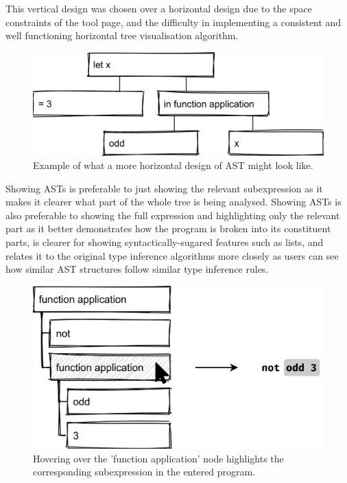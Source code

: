 \documentclass[a4paper,fleqn,oneside,12pt]{report}
\begin{document}
This vertical design was chosen over a horizontal design due to the space constraints of the tool page, and the difficulty in implementing a consistent and well functioning horizontal tree visualisation algorithm.

{\centering \begin{figure}[h!]
  \centering
  \includegraphics[width=0.813\linewidth]{images/image13.png}
  \caption{Example of what a more horizontal design of AST might look like.}
\end{figure} \par}

Showing ASTs is preferable to just showing the relevant subexpression as it makes it clearer what part of the whole tree is being analysed. Showing ASTs is also preferable to showing the full expression and highlighting only the relevant part as it better demonstrates how the program is broken into its constituent parts, is clearer for showing syntactically-sugared features such as lists, and relates it to the original type inference algorithms more closely as users can see how similar AST structures follow similar type inference rules.

{\centering \begin{figure}[h!]
  \centering
  \includegraphics[width=0.884\linewidth]{images/image26.png}
  \caption{Hovering over the 'function application' node highlights the corresponding subexpression in the entered program.}
\end{figure} \par}
\end{document}
